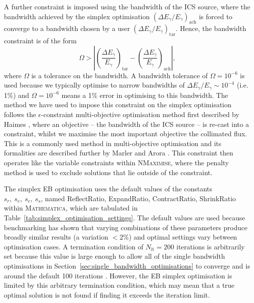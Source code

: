 \documentclass[../main.tex]{subfiles}
\begin{document}
A further constraint is imposed using the bandwidth of the ICS source, where the bandwidth achieved by the simplex optimisation $\left(\Delta E_{\gamma}/E_{\gamma}\right)_{\mathrm{ach}}$ is forced to converge to a bandwidth chosen by a user $\left(\Delta E_{\gamma}/E_{\gamma}\right)_{\mathrm{tar}}$. Hence, the bandwidth constraint is of the form
\begin{equation}
\Omega > \left|\left(\frac{\Delta E_{\gamma}}{E_{\gamma}}\right)_{\mathrm{tar}}-\left(\frac{\Delta E_{\gamma}}{E_{\gamma}}\right)_{\mathrm{ach}}\right|,    
\label{eq:simplex_epsilon_constraint}
\end{equation}
where $\Omega$ is a tolerance on the bandwidth. A bandwidth tolerance of $\Omega = 10^{-6}$ is used because we typically optimise to narrow bandwidths of $\Delta E_{\gamma}/E_{\gamma} \sim 10^{-4}$ (i.e. 1\%)  and $\Omega = 10^{-6}$ means a 1\% error in optimising to this bandwidth. The method we have used to impose this constraint on the simplex optimisation follows the $\epsilon$-constraint multi-objective optimisation method first described by Haimes \cite{haimes1971modeling}, where an objective -- the bandwidth of the ICS source -- is re-cast into a constraint, whilst we maximise the most important objective the collimated flux. This is a commonly used method in multi-objective optimisation and its formalities are described further by Marler and Arora \cite{marler2004survey}. This constraint then operates like the variable constraints within \textsc{NMaximise}, where the penalty method is used to exclude solutions that lie outside of the constraint.

The simplex EB optimisation uses the default values of the constants $s_{r},~s_{e}, ~s_{c},~s_{s}$, named ReflectRatio, ExpandRatio, ContractRatio, ShrinkRatio within \textsc{Mathematica}, which are tabulated in Table~\ref{tab:simplex_optimisation_settings}. The default values are used because benchmarking has shown that varying combinations of these parameters produce broadly similar results (a variation $ < 2$\%) and optimal settings vary between optimisation cases. A termination condition of $N_{\mathrm{it}} = 200$ iterations is arbitrarily set because this value is large enough to allow all of the single bandwidth optimisations in Section~\ref{sec:single_bandwidth_optimisations} to converge and is around the default 100 iterations \cite{wolfram2021nmaximize}. However, the EB simplex optimisation is limited by this arbitrary termination condition, which may mean that a true optimal solution is not found if finding it exceeds the iteration limit.
\end{document}
